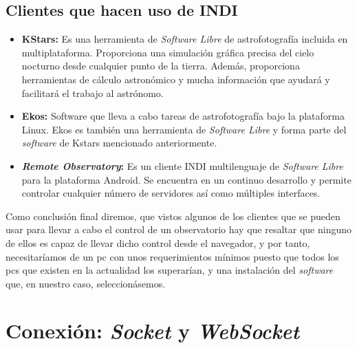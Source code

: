 \subsection{Clientes que hacen uso de INDI\cite{ClientesINDI}}
\begin{itemize}
  \item \textbf{KStars:} Es una herramienta de \textit{Software Libre} de astrofotografía incluida en multiplataforma. Proporciona una simulación gráfica precisa del cielo nocturno desde cualquier punto de la tierra. Además, proporciona herramientas de cálculo astronómico y mucha información que ayudará y facilitará el trabajo  al astrónomo.
  \item \textbf{Ekos:} Software que lleva a cabo tareas de astrofotografía bajo la plataforma Linux. Ekos es también una herramienta de \textit{Software Libre} y forma parte del \textit{software} de Kstars mencionado anteriormente.
  \item \textbf{\textit{Remote Observatory}:} Es un cliente INDI multilenguaje de \textit{Software Libre} para la plataforma Android. Se encuentra en un continuo desarrollo y permite controlar cualquier número de servidores así como múltiples interfaces.
\end{itemize}

Como conclusión final diremos, que vistos algunos de los clientes que se pueden usar para llevar a cabo el control de un observatorio hay que resaltar que ninguno de ellos es capaz de llevar dicho control desde el navegador, y por tanto, necesitaríamos de un pc con unos requerimientos mínimos puesto que todos los pcs que existen en la actualidad los superarían, y una instalación del \textit{software} que, en nuestro caso, seleccionásemos.

\section{Conexión: \textit{Socket} y \textit{WebSocket}}
